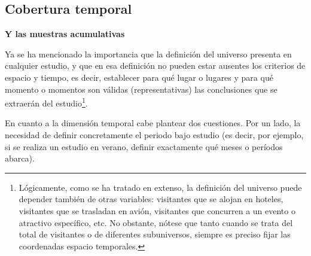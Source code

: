 \documentclass[
]{book}
\begin{document}
\hypertarget{cobertura-temporal}{%
\subsection{Cobertura temporal}\label{cobertura-temporal}}

\textbf{Y las muestras acumulativas}

Ya se ha mencionado la importancia que la definición del universo presenta en cualquier estudio, y que en esa definición no pueden estar ausentes los criterios de espacio y tiempo, es decir, establecer para qué lugar o lugares y para qué momento o momentos son válidas (representativas) las conclusiones que se extraerán del estudio\footnote{Lógicamente, como se ha tratado en extenso, la definición del universo puede depender también de otras variables: visitantes que se alojan en hoteles, visitantes que se trasladan en avión, visitantes que concurren a un evento o atractivo específico, etc. No obstante, nótese que tanto cuando se trata del total de visitantes o de diferentes subuniversos, siempre es preciso fijar las coordenadas espacio temporales.}.

En cuanto a la dimensión temporal cabe plantear dos cuestiones. Por un lado, la necesidad de definir concretamente el periodo bajo estudio (es decir, por ejemplo, si se realiza un estudio en verano, definir exactamente qué meses o períodos abarca).
\end{document}

